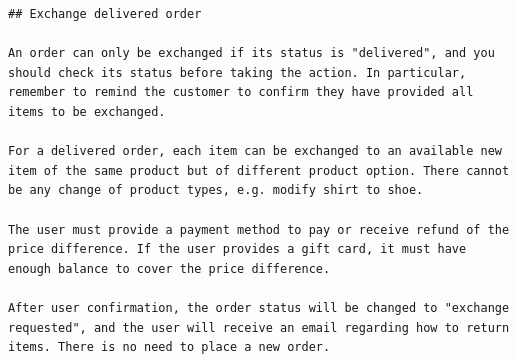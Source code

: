 \begin{lstlisting}
## Exchange delivered order

An order can only be exchanged if its status is "delivered", and you should check its status before taking the action. In particular, remember to remind the customer to confirm they have provided all items to be exchanged.

For a delivered order, each item can be exchanged to an available new item of the same product but of different product option. There cannot be any change of product types, e.g. modify shirt to shoe.

The user must provide a payment method to pay or receive refund of the price difference. If the user provides a gift card, it must have enough balance to cover the price difference.

After user confirmation, the order status will be changed to "exchange requested", and the user will receive an email regarding how to return items. There is no need to place a new order.
\end{lstlisting}

